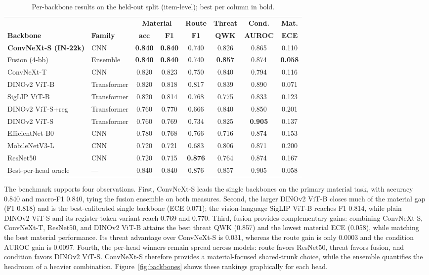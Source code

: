 \begin{table}[!h]
\centering
\caption{Per-backbone results on the held-out split (item-level); best per column in bold.}
\label{tab:backbones}
\footnotesize\setlength{\tabcolsep}{3.5pt}
\begin{tabular}{llcccccc}
\toprule
 & & \multicolumn{2}{c}{\textbf{Material}} & \textbf{Route} & \textbf{Threat} & \textbf{Cond.} & \textbf{Mat.} \\
\cmidrule(lr){3-4}
\textbf{Backbone} & \textbf{Family} & \textbf{acc} & \textbf{F1} & \textbf{F1} & \textbf{QWK} & \textbf{AUROC} & \textbf{ECE} \\
\midrule
\textbf{ConvNeXt-S (IN-22k)} & CNN & \textbf{0.840} & \textbf{0.840} & 0.740 & 0.826 & 0.865 & 0.110 \\
Fusion (4-bb) & Ensemble & \textbf{0.840} & \textbf{0.840} & 0.740 & \textbf{0.857} & 0.874 & \textbf{0.058} \\
ConvNeXt-T & CNN & 0.820 & 0.823 & 0.750 & 0.840 & 0.794 & 0.116 \\
DINOv2 ViT-B & Transformer & 0.820 & 0.818 & 0.817 & 0.839 & 0.890 & 0.071 \\
SigLIP ViT-B & Transformer & 0.820 & 0.814 & 0.768 & 0.775 & 0.833 & 0.123 \\
DINOv2 ViT-S+reg & Transformer & 0.760 & 0.770 & 0.666 & 0.840 & 0.850 & 0.201 \\
DINOv2 ViT-S & Transformer & 0.760 & 0.769 & 0.734 & 0.825 & \textbf{0.905} & 0.137 \\
EfficientNet-B0 & CNN & 0.780 & 0.768 & 0.766 & 0.716 & 0.874 & 0.153 \\
MobileNetV3-L & CNN & 0.720 & 0.721 & 0.683 & 0.806 & 0.871 & 0.200 \\
ResNet50 & CNN & 0.720 & 0.715 & \textbf{0.876} & 0.764 & 0.874 & 0.167 \\
\midrule
Best-per-head oracle & --- & 0.840 & 0.840 & 0.876 & 0.857 & 0.905 & 0.058 \\
\bottomrule
\end{tabular}
\end{table}

The benchmark supports four observations. First, ConvNeXt-S leads the single backbones on the primary material task, with accuracy 0.840 and macro-F1 0.840, tying the fusion ensemble on both measures. Second, the larger DINOv2 ViT-B closes much of the material gap (F1 0.818) and is the best-calibrated single backbone (ECE 0.071); the vision-language SigLIP ViT-B reaches F1 0.814, while plain DINOv2 ViT-S and its register-token variant reach 0.769 and 0.770. Third, fusion provides complementary gains: combining ConvNeXt-S, ConvNeXt-T, ResNet50, and DINOv2 ViT-B attains the best threat QWK (0.857) and the lowest material ECE (0.058), while matching the best material performance. Its threat advantage over ConvNeXt-S is 0.031, whereas the route gain is only 0.0003 and the condition AUROC gain is 0.0097. Fourth, the per-head winners remain spread across models: route favors ResNet50, threat favors fusion, and condition favors DINOv2 ViT-S. ConvNeXt-S therefore provides a material-focused shared-trunk choice, while the ensemble quantifies the headroom of a heavier combination. Figure~\ref{fig:backbones} shows these rankings graphically for each head.

